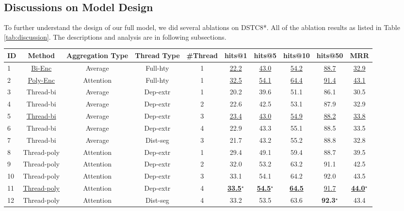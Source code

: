\subsection{Discussions on Model Design}

To further understand the design of our full model, we did several ablations on DSTC8*. All of the ablation results as listed in Table \ref{tab:discussion}. The descriptions and analysis are in following subsections.
\begin{table*}[th]
	\centering
	\small
	\begin{tabular}{lccccccccc}
		\toprule[1pt]
		ID &Method & Aggregation Type & Thread Type& \#Thread & hits@1 & hits@5 &hits@10 & hits@50 & MRR \\
		\midrule[1pt]
		1&\underline{Bi-Enc} & Average& Full-hty & 1& \underline{22.2} & \underline{43.0} & \underline{54.2} & \underline{88.7} & \underline{32.9} \\
		2&\underline{Poly-Enc} & Attention & Full-hty & 1 & \underline{32.5} & \underline{54.1} & \underline{64.4} & \underline{91.4} & \underline{43.1}  \\
		\midrule[0.5pt]
		3&Thread-bi& Average & Dep-extr & 1 & 20.2& 39.6& 51.1& 86.1& 30.5\\
		4&Thread-bi& Average & Dep-extr & 2 & 22.6& 42.5& 53.1&87.9 &32.9 \\
		5&\underline{Thread-bi}& Average & Dep-extr & 3 & \underline{23.4}& \underline{43.0}& \underline{54.9}& \underline{88.2}& \underline{33.8}\\
		6&Thread-bi& Average & Dep-extr & 4 &  22.9& 43.3& 55.1& 88.5& 33.5\\
		7&Thread-bi& Average & Dist-seg & 3 & 21.7 &43.2 & 55.2&88.8 &32.8 \\
		\midrule[0.5pt]
		8&Thread-poly& Attention & Dep-extr & 1 &29.4 &49.1 & 59.4& 88.7&39.5 \\
		9&Thread-poly& Attention & Dep-extr & 2 &32.0 &53.2 &63.2 &91.1 &42.5 \\
		10&Thread-poly& Attention & Dep-extr & 3 & 33.1 & 54.1& 64.2& 92.0 & 43.5 \\
		11&\underline{Thread-poly}& Attention & Dep-extr & 4 &  \underline{\bf 33.5$^\star$}& \underline{\bf 54.5$^\star$}& \underline{\bf 64.5}& \underline{91.7}& \underline{\bf 44.0$^\star$}\\
		12&Thread-poly& Attention & Dist-seg & 4 &33.2 &53.5 & 63.6&\bf 92.3$^\star$& 43.4\\
		\bottomrule[1pt]
	\end{tabular}
	\caption{Main results of DSTC8* (underlined) and ablation tests on DSTC8*. Scores marked with $^\star$ are statistically significantly better than Poly-Enc 
		with $p<0.05$ according to t-test.}
	\label{tab:discussion}
\end{table*}





